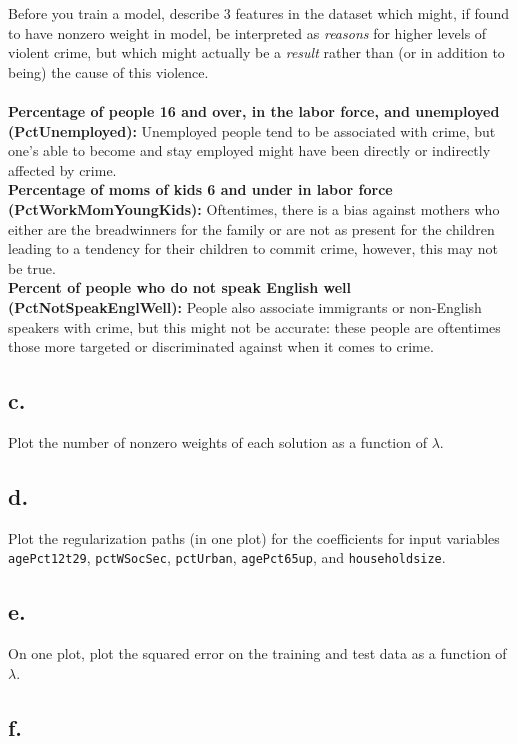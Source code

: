 \documentclass{article}
\newcommand{\1}{\mathbf{1}}
\begin{document}
{Before you train a model, describe 3 features in the dataset which might, if found to have nonzero weight in model, be interpreted as \emph{reasons} for higher levels of violent crime, but which might actually be a \emph{result} rather than (or in addition to being) the cause of this violence. \\ \\
\textbf{Percentage of people 16 and over, in the labor force, and unemployed (PctUnemployed):} Unemployed people tend to be associated with crime, but one's able to become and stay employed might have been directly or indirectly affected by crime. \\
\textbf{Percentage of moms of kids 6 and under in labor force (PctWorkMomYoungKids):} Oftentimes, there is a bias against mothers who either are the breadwinners for the family or are not as present for the children leading to a tendency for their children to commit crime, however, this may not be true. \\
\textbf{Percent of people who do not speak English well (PctNotSpeakEnglWell):} People also associate immigrants or non-English speakers with crime, but this might not be accurate: these people are oftentimes those more targeted or  discriminated against when it comes to crime. \\

\subsection*{c.}

Plot the number of nonzero weights of each solution as a function of $\lambda$.

\subsection*{d.}

Plot the regularization paths (in one plot) for the coefficients for input variables \texttt{agePct12t29}, \texttt{pctWSocSec}, \texttt{pctUrban}, \texttt{agePct65up}, and \texttt{householdsize}.

\subsection*{e.}

On one plot, plot the squared error on the training and test data as a function of $\lambda$.

\subsection*{f.}

}
\end{document}
